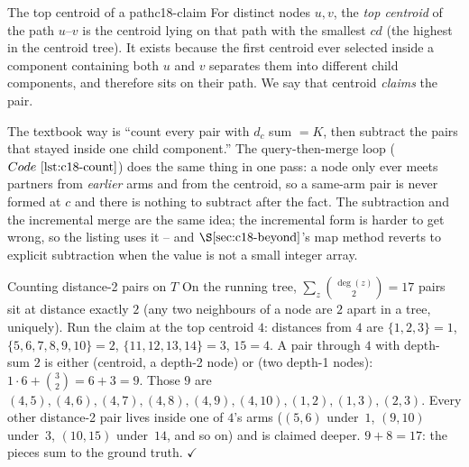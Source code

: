 \begin{definition}{The top centroid of a path}{c18-claim}
For distinct nodes \(u,v\), the \emph{top centroid} of the path \(u\text{--}v\) is
the centroid lying on that path with the smallest \(\mathit{cd}\) (the highest in
the centroid tree). It exists because the first centroid ever selected inside a
component containing both \(u\) and \(v\) separates them into different child
components, and therefore sits on their path. We say that centroid \emph{claims}
the pair.
\end{definition}

\begin{insightbox}
The textbook way is ``count every pair with \(d_c\) sum \(=K\), then subtract the
pairs that stayed inside one child component.'' The query-then-merge loop
(\(\coderef{c18-count}\)) does the same thing in one pass: a node only ever meets
partners from \emph{earlier} arms and from the centroid, so a same-arm pair is
never formed at \(c\) and there is nothing to subtract after the fact. The
subtraction and the incremental merge are the same idea; the incremental form is
harder to get wrong, so the listing uses it -- and \(\secref{c18-beyond}\)'s map
method reverts to explicit subtraction when the value is not a small integer
array.
\end{insightbox}

\begin{example}{Counting distance-2 pairs on \(T\)}
On the running tree, \(\sum_z\binom{\deg(z)}{2}=17\) pairs sit at distance exactly
\(2\) (any two neighbours of a node are \(2\) apart in a tree, uniquely). Run the
claim at the top centroid \(4\): distances from \(4\) are
\(\{1,2,3\}{=}1\), \(\{5,6,7,8,9,10\}{=}2\), \(\{11,12,13,14\}{=}3\), \(15{=}4\).
A pair through \(4\) with depth-sum \(2\) is either (centroid, a depth-2 node) or
(two depth-1 nodes): \(1\cdot 6 + \binom{3}{2}=6+3=9\). Those \(9\) are
\((4,5),(4,6),(4,7),(4,8),(4,9),(4,10),(1,2),(1,3),(2,3)\). Every other distance-2
pair lives inside one of \(4\)'s arms (\((5,6)\) under~\(1\), \((9,10)\) under~\(3\),
\((10,15)\) under~\(14\), and so on) and is claimed deeper. \(9+8=17\): the pieces
sum to the ground truth. \(\checkmark\)
\end{example}

